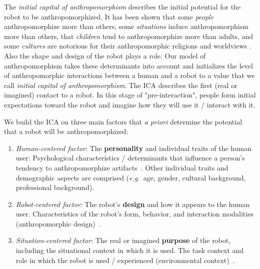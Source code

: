 \documentclass{sig-alternate-2013}
\newcommand{\eg}{{\textit{e.g.~}}}
\begin{document}
The \emph{initial capital of anthropomorphism} describes the initial potential 
for the robot to be anthropomorphized. It has been shown
that some \textit{people} anthropomorphize more than others, some
\textit{situations} induce anthropomorphism more than others, that
\textit{children} tend to anthropomorphize more than adults, and some
\textit{cultures} are notorious for their anthropomorphic religions and
worldviews \cite{epley_when_2008}. Also the shape and design of the robot 
plays a role. Our model of anthropomorphism takes these
determinants into account and initializes the level of anthropomorphic
interactions between a human and a robot to a value that we call
\textit{initial capital of anthropomorphism}. The ICA describes the first (real or imagined)
contact to a robot. In this stage of "pre-interaction", people form initial
expectations toward the robot and imagine how they will use it / interact with it.

We build the ICA on three main factors that \textit{a priori} determine the
potential that a robot will be anthropomorphized:

\begin{enumerate}

    \item \emph{Human-centered factor}: The \textbf{personality} and individual
        traits of the human user: Psychological characteristics / determinants
        that influence a person's tendency to anthropomorphize
        artifacts~\cite{epley_seeing_2007}. Other individual traits and
        demographic aspects are comprised (\eg age, gender, cultural
        background, professional background).
	
    \item \emph{Robot-centered factor}: The robot's \textbf{design} and how it
        appears to the human user. Characteristics of the robot's form,
        behavior, and interaction modalities (anthropomorphic
        design)~\cite{fong_survey_2003}.
	
    \item \emph{Situation-centered factor}: The real or imagined
        \textbf{purpose} of the robot, including the situational context in
        which it is used. The task context and role in which the robot is used
        / experienced (environmental context)~\cite{joosse_what_2013}.

\end{enumerate}	
\end{document}
